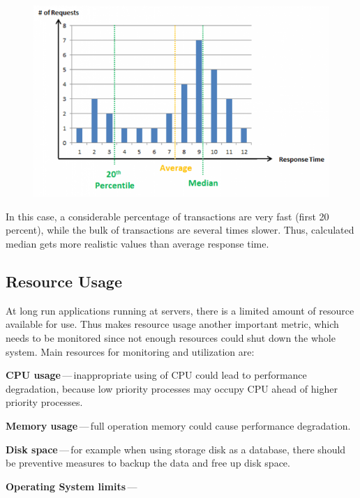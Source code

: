 \begin{figure}[H]
  \centering
  \includegraphics[width=15cm]{obrazky-figures/average_vs_percentile_2.png}
  \caption{}
  \label{fig:average_percentil_2}
\end{figure}

In this case, a considerable percentage of transactions are very fast (first 20 percent), while the bulk of transactions are several times slower. Thus, calculated median gets more realistic values than average response time.

\subsection{Resource Usage}
At long run applications running at servers, there is a limited amount of resource available for use. Thus makes resource usage another important metric, which needs to be monitored since not enough resources could shut down the whole system. Main resources for monitoring and utilization are:

\begin{description}
	\setlength\itemsep{0em}
	\item \textbf{CPU usage}\,---\,inappropriate using of CPU could lead to performance degradation, because low priority processes may occupy CPU ahead of higher priority processes.
	\item \textbf{Memory usage}\,---\,full operation memory could cause performance degradation.
	\item \textbf{Disk space}\,---\,for example when using storage disk as a database, there should be preventive measures to backup the data and free up disk space.
	\item \textbf{Operating System limits}\,---\,
\end{description}


